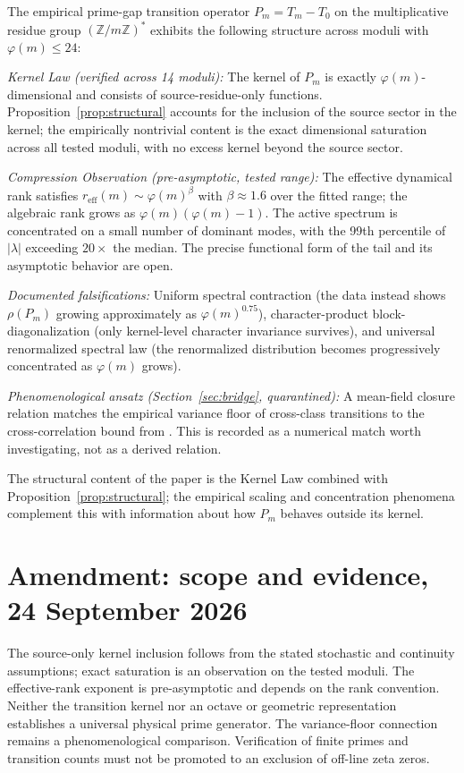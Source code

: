 \documentclass[11pt,a4paper]{article}
\begin{document}
The empirical prime-gap transition operator $P_m = T_m - T_0$ on the multiplicative residue group $(\mathbb{Z}/m\mathbb{Z})^*$ exhibits the following structure across moduli with $\varphi(m) \leq 24$:

\emph{Kernel Law (verified across 14 moduli):} The kernel of $P_m$ is exactly $\varphi(m)$-dimensional and consists of source-residue-only functions. Proposition~\ref{prop:structural} accounts for the inclusion of the source sector in the kernel; the empirically nontrivial content is the exact dimensional saturation across all tested moduli, with no excess kernel beyond the source sector.

\emph{Compression Observation (pre-asymptotic, tested range):} The effective dynamical rank satisfies $r_{\text{eff}}(m) \sim \varphi(m)^{\beta}$ with $\beta \approx 1.6$ over the fitted range; the algebraic rank grows as $\varphi(m)(\varphi(m) - 1)$. The active spectrum is concentrated on a small number of dominant modes, with the 99th percentile of $|\lambda|$ exceeding $20 \times$ the median. The precise functional form of the tail and its asymptotic behavior are open.

\emph{Documented falsifications:} Uniform spectral contraction (the data instead shows $\rho(P_m)$ growing approximately as $\varphi(m)^{0.75}$), character-product block-diagonalization (only kernel-level character invariance survives), and universal renormalized spectral law (the renormalized distribution becomes progressively concentrated as $\varphi(m)$ grows).

\emph{Phenomenological ansatz (Section~\ref{sec:bridge}, quarantined):} A mean-field closure relation matches the empirical variance floor of cross-class transitions to the cross-correlation bound from \cite{WallaceB}. This is recorded as a numerical match worth investigating, not as a derived relation.

The structural content of the paper is the Kernel Law combined with Proposition~\ref{prop:structural}; the empirical scaling and concentration phenomena complement this with information about how $P_m$ behaves outside its kernel.


\section*{Amendment: scope and evidence, 24 September 2026}
The source-only kernel inclusion follows from the stated stochastic and continuity assumptions; exact saturation is an observation on the tested moduli. The effective-rank exponent is pre-asymptotic and depends on the rank convention. Neither the transition kernel nor an octave or geometric representation establishes a universal physical prime generator. The variance-floor connection remains a phenomenological comparison. Verification of finite primes and transition counts must not be promoted to an exclusion of off-line zeta zeros.
\end{document}
